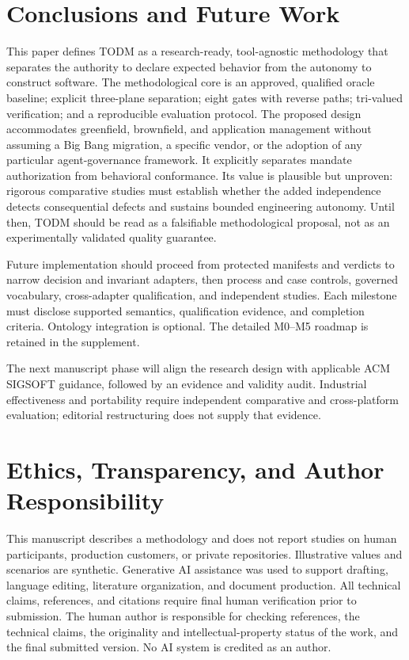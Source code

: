 \documentclass[11pt,a4paper]{article}
\newcommand{\todm}{\textsc{TODM}}
\begin{document}
\section{Conclusions and Future Work}
This paper defines \todm{} as a research-ready, tool-agnostic methodology that separates the authority to declare expected behavior from the autonomy to construct software. The methodological core is an approved, qualified oracle baseline; explicit three-plane separation; eight gates with reverse paths; tri-valued verification; and a reproducible evaluation protocol. The proposed design accommodates greenfield, brownfield, and application management without assuming a Big Bang migration, a specific vendor, or the adoption of any particular agent-governance framework. It explicitly separates mandate authorization from behavioral conformance. Its value is plausible but unproven: rigorous comparative studies must establish whether the added independence detects consequential defects and sustains bounded engineering autonomy. Until then, TODM should be read as a falsifiable methodological proposal, not as an experimentally validated quality guarantee.


Future implementation should proceed from protected manifests and verdicts to narrow decision and invariant adapters, then process and case controls, governed vocabulary, cross-adapter qualification, and independent studies. Each milestone must disclose supported semantics, qualification evidence, and completion criteria. Ontology integration is optional. The detailed M0--M5 roadmap is retained in the supplement.

The next manuscript phase will align the research design with applicable ACM SIGSOFT guidance, followed by an evidence and validity audit. Industrial effectiveness and portability require independent comparative and cross-platform evaluation; editorial restructuring does not supply that evidence.

\section*{Ethics, Transparency, and Author Responsibility}
This manuscript describes a methodology and does not report studies on human participants, production customers, or private repositories. Illustrative values and scenarios are synthetic. Generative AI assistance was used to support drafting, language editing, literature organization, and document production. All technical claims, references, and citations require final human verification prior to submission. The human author is responsible for checking references, the technical claims, the originality and intellectual-property status of the work, and the final submitted version. No AI system is credited as an author.
\end{document}
